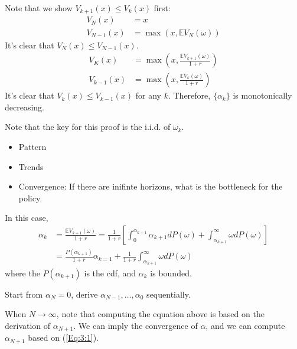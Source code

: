 Note that we show $V_{k+1}(x)\le V_k(x)$ first:
\begin{align*}
V_N(x)&=x\\
V_{N-1}(x)&=\max(x,\mathbb{E}V_N(\omega))
\end{align*}
It's clear that $V_N(x)\le V_{N-1}(x)$.
\begin{align*}
V_K(x)&=\max(x,\frac{\mathbb{E}V_{k+1}(\omega)}{1+r})\\
V_{k-1}(x)&=\max(x,\frac{\mathbb{E}V_{k}(\omega)}{1+r})
\end{align*}
It's clear that $V_k(x)\le V_{k-1}(x)$ for any $k$. Therefore,  $\{\alpha_k\}$ is monotonically decreasing.

Note that the key for this proof is the i.i.d. of $\omega_k$.

\begin{itemize}
\item
Pattern
\item
Trends
\item
Convergence: If there are inifinte horizons, what is the bottleneck for the policy.
\end{itemize}

In this case,
\begin{equation}\label{Eq:3:1}
\begin{aligned}
\alpha_k &= \frac{\mathbb{E}V_{k+1}(\omega)}{1+r}
=
\frac{1}{1+r}
\left[\int_0^{\alpha_{k+1}}\alpha_{k+1}d P(\omega)
+
\int_{\alpha_{k+1}}^\infty \omega d P(\omega)
\right]\\
&=\frac{P(\alpha_{k+1})}{1+r}\alpha_{k=1}
+
\frac{1}{1+r}\int_{\alpha_{k+1}}^\infty\omega d P(\omega)
\end{aligned}
\end{equation}
where the $P(\alpha_{k+1})$ is the cdf, and $\alpha_k$ is bounded.


Start from $\alpha_N=0$, derive $\alpha_{N-1},\dots,\alpha_0$ sequentially.

When $N\to\infty$, note that computing the equation above is based on the derivation of $\alpha_{N+1}$. We can imply the convergence of $\alpha$, and we can compute $\alpha_{N+1}$ based on (\ref{Eq:3:1}).









